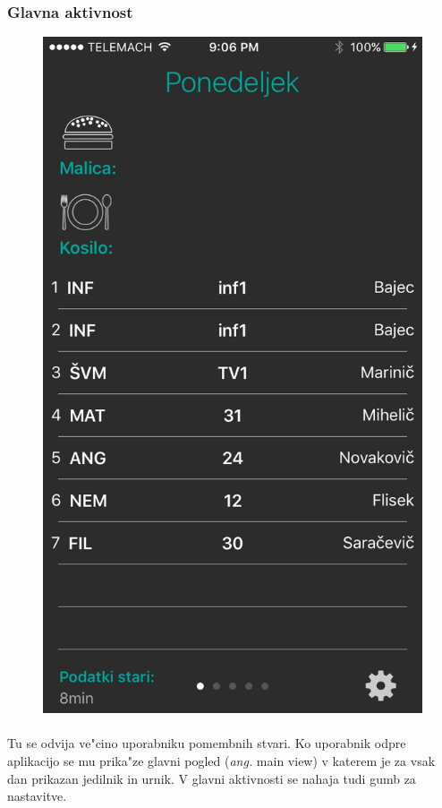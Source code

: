\subsubsection{Glavna aktivnost}
\begin{figure}
	\includegraphics[width=\linewidth]{images/main_view.png}
\end{figure}
\paragraph{}Tu se odvija ve"cino uporabniku pomembnih stvari. Ko uporabnik odpre aplikacijo se mu prika"ze glavni pogled (\textit{ang.} main view) v katerem je za vsak dan prikazan jedilnik in urnik. V glavni aktivnosti se nahaja tudi gumb za nastavitve.

